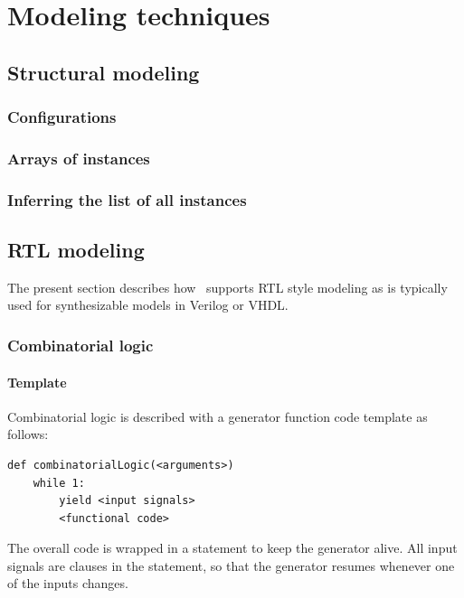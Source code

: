 \chapter{Modeling techniques \label{model}}

\section{Structural modeling \label{model-structure}}

\subsection{Configurations \label{model-conf}}

\subsection{Arrays of instances \label{model-instarray}}

\subsection{Inferring the list of all instances \label{model-infer-instlist}}

\section{RTL modeling \label{model-rtl}}
The present section describes how \myhdl\ supports RTL style modeling
as is typically used for synthesizable models in Verilog or VHDL. 

\subsection{Combinatorial logic \label{model-comb}}

\subsubsection{Template \label{model-comb-templ}}
 
Combinatorial logic is described with a generator function code template as
follows: 

\begin{verbatim}
def combinatorialLogic(<arguments>)
    while 1:
        yield <input signals>
        <functional code>
\end{verbatim}

The overall code is wrapped in a  statement to keep the
generator alive. All input signals are clauses in the 
statement, so that the generator resumes whenever one of the inputs
changes.

